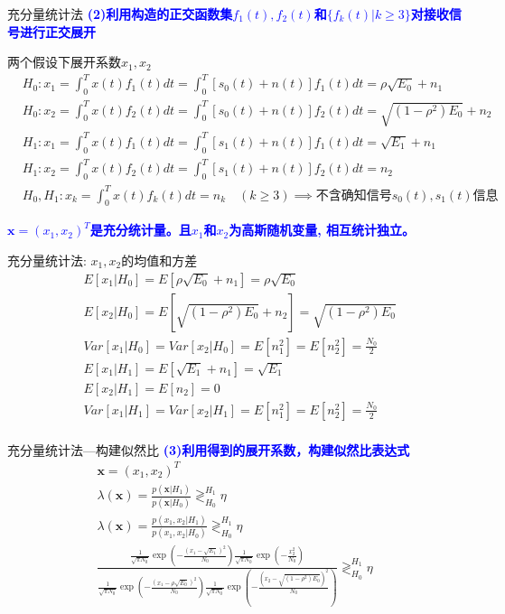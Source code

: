 \begin{frame}[shrink]{充分量统计法}
\textbf{\textcolor{blue}{(2)利用构造的正交函数集$f_1(t),f_2(t)$和$\{f_k(t)|k\ge 3\}$对接收信号进行正交展开}}
\begin{block}{两个假设下展开系数$x_1,x_2$}
\begin{align*}
&H_0: x_1=\int_{0}^{T}x(t)f_1(t)dt=\int_{0}^{T}[s_0(t)+n(t)]f_1(t)dt=\rho\sqrt{E_0}+n_1\\
&H_0: x_2=\int_{0}^{T}x(t)f_2(t)dt=\int_{0}^{T}[s_0(t)+n(t)]f_2(t)dt=\sqrt{(1-\rho^2)E_0}+n_2\\
&H_1: x_1=\int_{0}^{T}x(t)f_1(t)dt=\int_{0}^{T}[s_1(t)+n(t)]f_1(t)dt=\sqrt{E_1}+n_1\\
&H_1: x_2=\int_{0}^{T}x(t)f_2(t)dt=\int_{0}^{T}[s_1(t)+n(t)]f_2(t)dt=n_2\\
&H_0,H_1: x_k=\int_{0}^{T}x(t)f_k(t)dt=n_k \quad (k\ge 3)\implies\text{不含确知信号$s_0(t),s_1(t)$信息}
\end{align*}
\end{block}
\textbf{\textcolor{blue}{$\bm{x}=(x_1,x_2)^T$是充分统计量。且$x_1$和$x_2$为高斯随机变量, 相互统计独立。}}
\end{frame}

\begin{frame}[shrink]{充分量统计法: $x_1,x_2$的均值和方差}
\begin{align*}
&E[x_1|H_0]=E\left[\rho\sqrt{E_0}+n_1\right]=\rho\sqrt{E_0}\\
&E[x_2|H_0]=E\left[\sqrt{(1-\rho^2)E_0}+n_2\right]=\sqrt{(1-\rho^2)E_0}\\
&Var[x_1|H_0]=Var[x_2|H_0]=E[n_1^2]=E[n_2^2]=\frac{N_0}{2}\\
&E[x_1|H_1]=E\left[\sqrt{E_1}+n_1\right]=\sqrt{E_1}\\
&E[x_2|H_1]=E[n_2]=0\\
&Var[x_1|H_1]=Var[x_2|H_1]=E[n_1^2]=E[n_2^2]=\frac{N_0}{2}\\
\end{align*}
\end{frame}

\begin{frame}[shrink]{充分量统计法---构建似然比}
\textbf{\textcolor{blue}{(3)利用得到的展开系数，构建似然比表达式
}}
\begin{align*}
\bm{x}=(x_1,x_2)^T\\
\lambda(\bm{x})=\frac{p(\bm{x}|H_1)}{p(\bm{x}|H_0)}\mathop{\gtrless}_{H_0}^{H_1}\eta\\
\lambda(\bm{x})=\frac{p(x_1,x_2|H_1)}{p(x_1,x_2|H_0)}\mathop{\gtrless}_{H_0}^{H_1}\eta\\
\frac{\frac{1}{\sqrt{\pi N_0}}\exp\left(-\frac{\left(x_1-\sqrt{E_1}\right)^2}{N_0}\right)\frac{1}{\sqrt{\pi N_0}}\exp\left(-\frac{x_2^2}{N_0}\right)}
{\frac{1}{\sqrt{\pi N_0}}\exp\left(-\frac{\left(x_1-\rho\sqrt{E_0}\right)^2}{N_0}\right)\frac{1}{\sqrt{\pi N_0}}\exp\left(-\frac{\left(x_2-\sqrt{(1-\rho^2)E_0}\right)^2}{N_0}\right)}
\mathop{\gtrless}_{H_0}^{H_1}\eta
\end{align*}
\end{frame}

